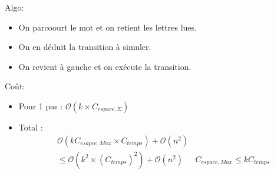 \documentclass{article}
\theoremstyle{plain}
\theoremstyle{nonumberplain}
\begin{document}

   Algo: 

  \begin{itemize}
    
    \item On parcoourt le mot et on retient les lettres lues. 

    \item On en déduit la transition à simuler.

    \item On revient à gauche et on exécute la transition. 
  \end{itemize}

  Coût: \begin{itemize}
    \item Pour 1 pas : $\mathcal{O}(k \times C_{espace, \Sigma})$

    \item Total : \begin{align*}
        & \mathcal{O}(k C_{esapce, Max} \times C_{temps}) + \mathcal{O}(n^2) \\
        & \leq \mathcal{O}(k^2 \times (C_{temps})^2) + \mathcal{O}(n^2)     
        & C_{espace, Max} \leq k C_{temps}
    \end{align*}
  \end{itemize}
\end{document}
